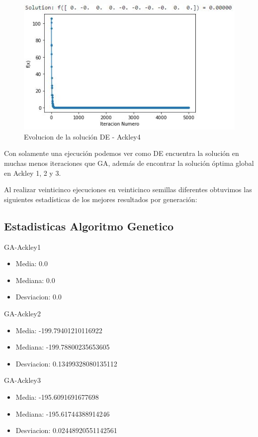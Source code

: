 \documentclass[10pt]{article}
\begin{document}
\begin{figure}[H]
\centerline{\includegraphics{ack-4-de.jpg}}
\caption{Evolucion de la solución DE - Ackley4}
\label{fig_8}
\end{figure}

Con solamente una ejecución podemos ver como DE encuentra la solución en muchas menos iteraciones que GA, además de encontrar la solución óptima global en Ackley 1, 2 y 3.

Al realizar veinticinco ejecuciones en veinticinco semillas diferentes obtuvimos las siguientes estadísticas de los mejores resultados por generación:

\subsection{Estadisticas Algoritmo Genetico}
GA-Ackley1
\begin{itemize}
\item
Media:  0.0 
\item%
Mediana:  0.0 
\item%
Desviacion:  0.0
\end{itemize}

GA-Ackley2
\begin{itemize}
\item
Media:  -199.79401210116922 
\item%
Mediana:  -199.78800235653605 
\item%
Desviacion:  0.13499328080135112
\end{itemize}

GA-Ackley3
\begin{itemize}
\item
Media:  -195.6091691677698 
\item%
Mediana:  -195.61744388914246 
\item%
Desviacion:  0.02448920551142561
\end{itemize}
\end{document}
